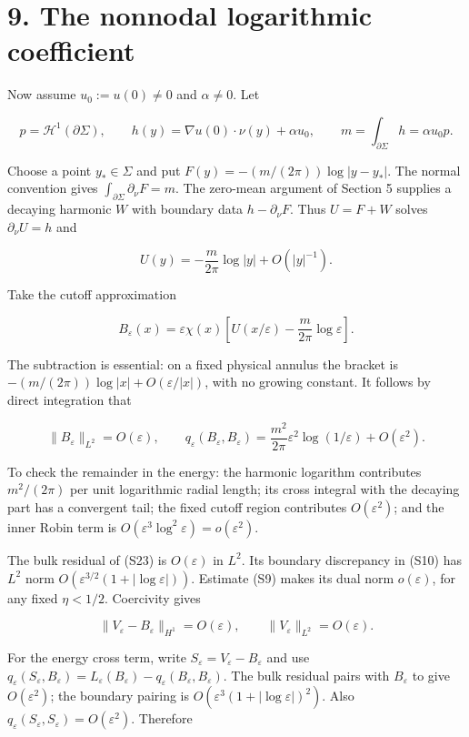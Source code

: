 \documentclass[11pt]{article}
\begin{document}
\section{9. The nonnodal logarithmic
coefficient}\label{the-nonnodal-logarithmic-coefficient}

Now assume \(u_0:=u(0)\ne0\) and \(\alpha\ne0\). Let

\[
 p=\mathcal H^1(\partial\Sigma),\qquad
 h(y)=\nabla u(0)\cdot\nu(y)+\alpha u_0,
 \qquad m=\int_{\partial\Sigma}h=\alpha u_0p.
\]

Choose a point \(y_*\in\Sigma\) and put \(F(y)=-(m/(2\pi))\log|y-y_*|\).
The normal convention gives \(\int_{\partial\Sigma}\partial_\nu F=m\).
The zero-mean argument of Section 5 supplies a decaying harmonic \(W\)
with boundary data \(h-\partial_\nu F\). Thus \(U=F+W\) solves
\(\partial_\nu U=h\) and

\[
 U(y)=-\frac m{2\pi}\log|y|+O(|y|^{-1}).
\]

Take the cutoff approximation

\[
 B_\varepsilon(x)=\varepsilon\chi(x)
 \left[U(x/\varepsilon)-\frac m{2\pi}\log\varepsilon\right].
 \tag{S23}
\]

The subtraction is essential: on a fixed physical annulus the bracket is
\(-(m/(2\pi))\log|x|+O(\varepsilon/|x|)\), with no growing constant. It
follows by direct integration that

\[
 \|B_\varepsilon\|_{L^2}=O(\varepsilon),\qquad
 q_\varepsilon(B_\varepsilon,B_\varepsilon)
 =\frac{m^2}{2\pi}\varepsilon^2\log(1/\varepsilon)
      +O(\varepsilon^2).
 \tag{S24}
\]

To check the remainder in the energy: the harmonic logarithm contributes
\(m^2/(2\pi)\) per unit logarithmic radial length; its cross integral
with the decaying part has a convergent tail; the fixed cutoff region
contributes \(O(\varepsilon^2)\); and the inner Robin term is
\(O(\varepsilon^3\log^2\varepsilon)=o(\varepsilon^2)\).

The bulk residual of (S23) is \(O(\varepsilon)\) in \(L^2\). Its
boundary discrepancy in (S10) has \(L^2\) norm
\(O(\varepsilon^{3/2}(1+|\log\varepsilon|))\). Estimate (S9) makes its
dual norm \(o(\varepsilon)\), for any fixed \(\eta<1/2\). Coercivity
gives

\[
 \|V_\varepsilon-B_\varepsilon\|_{H^1}=O(\varepsilon),\qquad
 \|V_\varepsilon\|_{L^2}=O(\varepsilon).
\]

For the energy cross term, write
\(S_\varepsilon=V_\varepsilon-B_\varepsilon\) and use
\(q_\varepsilon(S_\varepsilon,B_\varepsilon)
=L_\varepsilon(B_\varepsilon)-q_\varepsilon(B_\varepsilon,B_\varepsilon)\).
The bulk residual pairs with \(B_\varepsilon\) to give
\(O(\varepsilon^2)\); the boundary pairing is
\(O(\varepsilon^3(1+|\log\varepsilon|)^2)\). Also
\(q_\varepsilon(S_\varepsilon,S_\varepsilon)=O(\varepsilon^2)\).
Therefore
\end{document}
